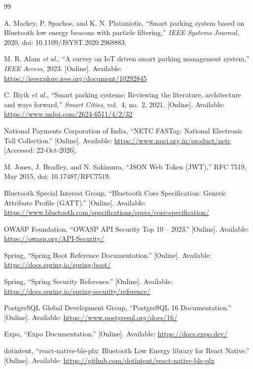 \renewcommand{\bibname}{References}

\begin{thebibliography}{99}

A. Mackey, P. Spachos, and K. N. Plataniotis, ``Smart parking system based on
Bluetooth low energy beacons with particle filtering,'' \emph{IEEE Systems Journal},
2020, doi: 10.1109/JSYST.2020.2968883.

M. R. Alam \emph{et al.}, ``A survey on IoT driven smart parking management
system,'' \emph{IEEE Access}, 2023. [Online]. Available:
\url{https://ieeexplore.ieee.org/document/10292845}

C. Biyik \emph{et al.}, ``Smart parking systems: Reviewing the literature,
architecture and ways forward,'' \emph{Smart Cities}, vol.~4, no.~2, 2021.
[Online]. Available: \url{https://www.mdpi.com/2624-6511/4/2/32}

National Payments Corporation of India, ``NETC FASTag: National Electronic Toll
Collection.'' [Online]. Available: \url{https://www.npci.org.in/product/netc}
[Accessed: 22-Oct-2026].

M. Jones, J. Bradley, and N. Sakimura, ``JSON Web Token (JWT),'' RFC 7519,
May 2015, doi: 10.17487/RFC7519.

Bluetooth Special Interest Group, ``Bluetooth Core Specification: Generic
Attribute Profile (GATT).'' [Online]. Available:
\url{https://www.bluetooth.com/specifications/specs/core-specification/}

OWASP Foundation, ``OWASP API Security Top 10 -- 2023.'' [Online]. Available:
\url{https://owasp.org/API-Security/}

Spring, ``Spring Boot Reference Documentation.'' [Online]. Available:
\url{https://docs.spring.io/spring-boot/}

Spring, ``Spring Security Reference.'' [Online]. Available:
\url{https://docs.spring.io/spring-security/reference/}

PostgreSQL Global Development Group, ``PostgreSQL 16 Documentation.'' [Online].
Available: \url{https://www.postgresql.org/docs/16/}

Expo, ``Expo Documentation.'' [Online]. Available: \url{https://docs.expo.dev/}

dotintent, ``react-native-ble-plx: Bluetooth Low Energy library for React
Native.'' [Online]. Available:
\url{https://github.com/dotintent/react-native-ble-plx}


\end{thebibliography}

